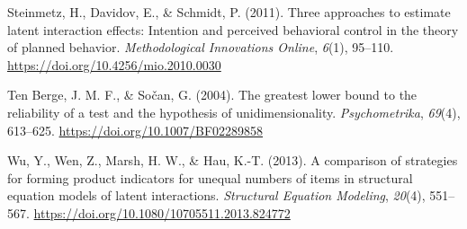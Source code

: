 \documentclass[
  man,mask]{apa6}
\newlength{\cslhangindent}
\newenvironment{CSLReferences}[2] %
 {\begin{list}{}{%
  \setlength{\itemindent}{0pt}
  \setlength{\leftmargin}{0pt}
  \setlength{\parsep}{0pt}
  \ifodd #1
   \setlength{\leftmargin}{\cslhangindent}
   \setlength{\itemindent}{-1\cslhangindent}
  \fi
  \setlength{\itemsep}{#2\baselineskip}}}
 {\end{list}}
\begin{document}
\begin{CSLReferences}{1}{0}
Steinmetz, H., Davidov, E., \& Schmidt, P. (2011). Three approaches to estimate latent interaction effects: {Intention} and perceived behavioral control in the theory of planned behavior. \emph{Methodological Innovations Online}, \emph{6}(1), 95--110. \url{https://doi.org/10.4256/mio.2010.0030}

Ten Berge, J. M. F., \& Sočan, G. (2004). The greatest lower bound to the reliability of a test and the hypothesis of unidimensionality. \emph{Psychometrika}, \emph{69}(4), 613--625. \url{https://doi.org/10.1007/BF02289858}

Wu, Y., Wen, Z., Marsh, H. W., \& Hau, K.-T. (2013). A comparison of strategies for forming product indicators for unequal numbers of items in structural equation models of latent interactions. \emph{Structural Equation Modeling}, \emph{20}(4), 551--567. \url{https://doi.org/10.1080/10705511.2013.824772}

\end{CSLReferences}
\end{document}
